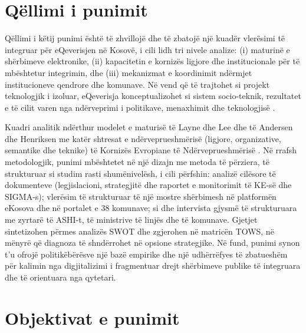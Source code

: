 \documentclass[conference]{IEEEtran}
\begin{document}
\section{Qëllimi i punimit}
\label{sec:qellimi}

Qëllimi i këtij punimi është të zhvillojë dhe të zbatojë një kuadër
vlerësimi të integruar për eQeverisjen në Kosovë, i cili lidh tri nivele
analize: (i) maturinë e shërbimeve elektronike, (ii) kapacitetin e
kornizës ligjore dhe institucionale për të mbështetur integrimin, dhe
(iii) mekanizmat e koordinimit ndërmjet institucioneve qendrore dhe
komunave. Në vend që të trajtohet si projekt teknologjik i izoluar,
eQeverisja konceptualizohet si sistem socio-teknik, rezultatet e të cilit
varen nga ndërveprimi i politikave, menaxhimit dhe teknologjisë
\cite{pardo2012,fountain2001}.

Kuadri analitik ndërthur modelet e maturisë të Layne dhe Lee
\cite{layne2001} dhe të Andersen dhe Henriksen \cite{andersen2006} me katër
shtresat e ndërveprueshmërisë (ligjore, organizative, semantike dhe
teknike) të Kornizës Evropiane të Ndërveprueshmërisë \cite{eif2017}. Në
rrafsh metodologjik, punimi mbështetet në një dizajn me metoda të
përziera, të strukturuar si studim rasti shumënivelësh, i cili përfshin:
analizë cilësore të dokumenteve (legjislacioni, strategjitë dhe raportet e
monitorimit të KE-së dhe SIGMA-s); vlerësim të strukturuar të një mostre
shërbimesh në platformën eKosova dhe në portalet e 38 komunave; si dhe
intervista gjysmë të strukturuara me zyrtarë të ASHI-t, të ministrive të
linjës dhe të komunave. Gjetjet sintetizohen përmes analizës SWOT dhe
zgjerohen në matricën TOWS, në mënyrë që diagnoza të shndërrohet në
opsione strategjike. Në fund, punimi synon t'u ofrojë politikëbërësve një
bazë empirike dhe një udhërrëfyes të zbatueshëm për kalimin nga
digjitalizimi i fragmentuar drejt shërbimeve publike të integruara dhe të
orientuara nga qytetari.

\section{Objektivat e punimit}
\label{sec:objektivat}
\end{document}
